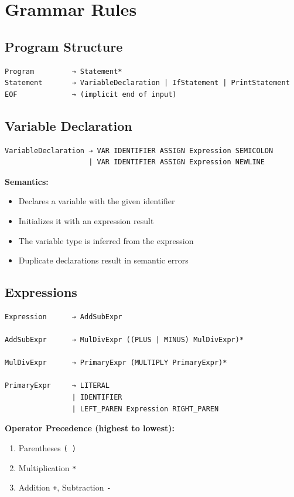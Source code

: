 \documentclass[12pt,a4paper]{report}
\begin{document}


\section{Grammar Rules}

\subsection{Program Structure}
\begin{verbatim}
Program         → Statement*
Statement       → VariableDeclaration | IfStatement | PrintStatement
EOF             → (implicit end of input)
\end{verbatim}

\subsection{Variable Declaration}
\begin{verbatim}
VariableDeclaration → VAR IDENTIFIER ASSIGN Expression SEMICOLON
                    | VAR IDENTIFIER ASSIGN Expression NEWLINE
\end{verbatim}

\textbf{Semantics:}
\begin{itemize}
    \item Declares a variable with the given identifier
    \item Initializes it with an expression result
    \item The variable type is inferred from the expression
    \item Duplicate declarations result in semantic errors
\end{itemize}

\subsection{Expressions}
\begin{verbatim}
Expression      → AddSubExpr

AddSubExpr      → MulDivExpr ((PLUS | MINUS) MulDivExpr)*

MulDivExpr      → PrimaryExpr (MULTIPLY PrimaryExpr)*

PrimaryExpr     → LITERAL
                | IDENTIFIER
                | LEFT_PAREN Expression RIGHT_PAREN
\end{verbatim}

\textbf{Operator Precedence (highest to lowest):}
\begin{enumerate}
    \item Parentheses \texttt{( )}
    \item Multiplication \texttt{*}
    \item Addition \texttt{+}, Subtraction \texttt{-}
\end{enumerate}
\end{document}
